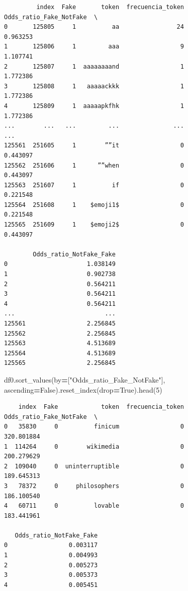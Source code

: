 \documentclass[
  11pt,
  a4paper,
]{article}
\newenvironment{Shaded}{\begin{snugshade}}{\end{snugshade}}
\newcommand{\DecValTok}[1]{\textcolor[rgb]{0.00,0.00,0.81}{#1}}
\newcommand{\NormalTok}[1]{#1}
\newcommand{\OperatorTok}[1]{\textcolor[rgb]{0.81,0.36,0.00}{\textbf{#1}}}
\newcommand{\StringTok}[1]{\textcolor[rgb]{0.31,0.60,0.02}{#1}}
\newcommand{\VariableTok}[1]{\textcolor[rgb]{0.00,0.00,0.00}{#1}}
\begin{document}
\begin{verbatim}
         index  Fake       token  frecuencia_token  Odds_ratio_Fake_NotFake  \
0       125805     1          aa                24                 0.963253   
1       125806     1         aaa                 9                 1.107741   
2       125807     1  aaaaaaaand                 1                 1.772386   
3       125808     1   aaaaackkk                 1                 1.772386   
4       125809     1  aaaaapkfhk                 1                 1.772386   
...        ...   ...         ...               ...                      ...   
125561  251605     1        ””it                 0                 0.443097   
125562  251606     1      ””when                 0                 0.443097   
125563  251607     1          if                 0                 0.221548   
125564  251608     1    $emoji1$                 0                 0.221548   
125565  251609     1    $emoji2$                 0                 0.443097   

        Odds_ratio_NotFake_Fake  
0                      1.038149  
1                      0.902738  
2                      0.564211  
3                      0.564211  
4                      0.564211  
...                         ...  
125561                 2.256845  
125562                 2.256845  
125563                 4.513689  
125564                 4.513689  
125565                 2.256845  
\end{verbatim}

\begin{Shaded}
\begin{Highlighting}[]
\NormalTok{df0.sort\_values(by}\OperatorTok{=}\NormalTok{[}\StringTok{"Odds\_ratio\_Fake\_NotFake"}\NormalTok{], ascending}\OperatorTok{=}\VariableTok{False}\NormalTok{).reset\_index(drop}\OperatorTok{=}\VariableTok{True}\NormalTok{).head(}\DecValTok{5}\NormalTok{)}
\end{Highlighting}
\end{Shaded}

\begin{verbatim}
    index  Fake            token  frecuencia_token  Odds_ratio_Fake_NotFake  \
0   35830     0          finicum                 0               320.801884   
1  114264     0        wikimedia                 0               200.279629   
2  109040     0  uninterruptible                 0               189.645313   
3   78372     0     philosophers                 0               186.100540   
4   60711     0          lovable                 0               183.441961   

   Odds_ratio_NotFake_Fake  
0                 0.003117  
1                 0.004993  
2                 0.005273  
3                 0.005373  
4                 0.005451
\end{verbatim}
\end{document}
